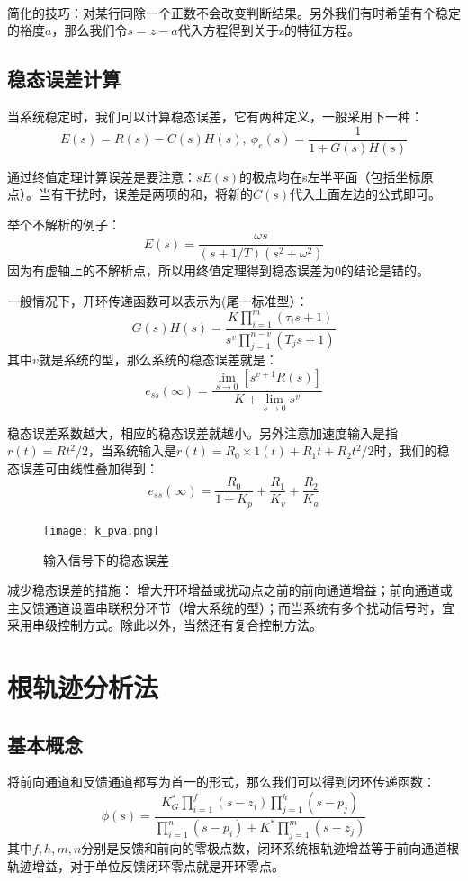 \documentclass[lang=cn,10pt]{elegantbook}
\begin{document}
~\par
简化的技巧：对某行同除一个正数不会改变判断结果。另外我们有时希望有个稳定的裕度$a$，那么我们令$s=z-a$代入方程得到关于z的特征方程。

\section{稳态误差计算}
当系统稳定时，我们可以计算稳态误差，它有两种定义，一般采用下一种：
\[E(s)=R(s)-C(s)H(s),~ \phi_e(s)=\frac{1}{1+G(s)H(s)}\]

通过终值定理计算误差是要注意：$sE(s)$的极点均在s左半平面（包括坐标原点）。当有干扰时，误差是两项的和，将新的$C(s)$代入上面左边的公式即可。

举个不解析的例子：
\[E(s)=\frac{\omega s}{(s+1/T)(s^2+\omega^2)}\]
因为有虚轴上的不解析点，所以用终值定理得到稳态误差为0的结论是错的。

一般情况下，开环传递函数可以表示为(尾一标准型）：
\[G(s)H(s)=\frac{K\prod\limits_{i=1}^m (\tau_i s+1)}{s^v \prod\limits_{j=1}^{n-v}(T_j s +1)}\]
其中$v$就是系统的型，那么系统的稳态误差就是：
\[e_{ss}(\infty)=\frac{\lim\limits_{s \to 0}[s^{v+1}R(s)]}{K+\lim\limits_{s \to 0}s^v}\]

稳态误差系数越大，相应的稳态误差就越小。另外注意加速度输入是指$r(t)=Rt^2/2$，当系统输入是$r(t)=R_0 \times 1(t)+R_1t+R_2t^2/2$时，我们的稳态误差可由线性叠加得到：
\[e_{ss}(\infty)=\frac{R_0}{1+K_p}+\frac{R_1}{K_v}+\frac{R_2}{K_a}\]

\begin{figure}[htbp]
  \centering
  \texttt{[image: k\_pva.png]}
  \caption{输入信号下的稳态误差} \label{fig:k_pva}
\end{figure}

减少稳态误差的措施：
增大开环增益或扰动点之前的前向通道增益；前向通道或主反馈通道设置串联积分环节（增大系统的型）；而当系统有多个扰动信号时，宜采用串级控制方式。除此以外，当然还有复合控制方法。
\chapter{根轨迹分析法}

\section{基本概念}

将前向通道和反馈通道都写为首一的形式，那么我们可以得到闭环传递函数：
\[\phi(s)=\frac{K_G^* \prod\limits_{i=1}^f (s-z_i) \prod\limits_{j=1}^
h (s-p_j)}{\prod\limits_{i=1}^
n (s-p_i) + K^* \prod\limits_{j=1}^m (s-z_j)} \]
其中$f,h,m,n$分别是反馈和前向的零极点数，闭环系统根轨迹增益等于前向通道根轨迹增益，对于单位反馈闭环零点就是开环零点。
\end{document}
